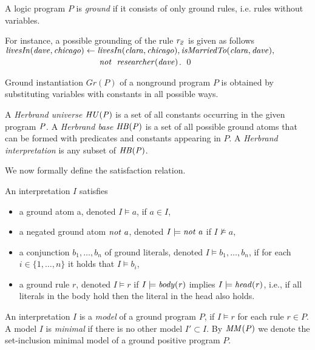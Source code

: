 A logic program $P$ is \emph{ground} if it consists of only ground rules, i.e. rules without
variables. 

\begin{example}
For instance, a possible grounding of the rule $\mathit{r_2}$ is given as follows $\mathit{livesIn(dave,chicago)\leftarrow livesIn(clara,chicago),isMarriedTo(clara,dave),}$\\$
\phantom{livesIn(dave,chicago)\leftarrow}\mathit{not}~ \mathit{\;researcher(dave)}$. \qed
\end{example}

Ground instantiation $Gr(P)$ of a nonground program $P$ is obtained by substituting variables with constants in all possible ways. 


\begin{definition}
A \emph{Herbrand universe}  $\mathit{HU(P)}$ is a set of all constants occurring in the given program $\mathit{P}$. A \emph{Herbrand base}  $\mathit{HB(P)}$ is a set of all possible ground atoms that can be formed with predicates and constants appearing in $P$. A \emph{Herbrand interpretation} is any subset of $\mathit{HB(P)}$.
\end{definition}

We now formally define the satisfaction relation.

\begin{definition} An interpretation $I$ satisfies
\begin{itemize}
\item a ground atom a, denoted $I \models a$, if $a \in I$,
\item a negated ground atom $\mathit{not\; a}$, denoted $I \models \mathit{not\; a}$ if $I \not \models a$,
\item  a conjunction $b_1,\dotsc,b_n$ of ground literals, denoted $I \models b_1,\dotsc,b_n$, if for
each $i\in \{1,\dotsc, n\}$ it holds that $I \models b_i$,
\item a ground rule $r$, denoted $I \models r$ if $I \models \mathit{body(r)}$ implies $I \models \mathit{head(r)}$, i.e., if all literals in the body hold then the literal in the head also holds.
\end{itemize}
\end{definition}

An interpretation $I$ is a \emph{model} of a ground program $P$, if $I \models r$ for each rule
$r \in P$. A model $I$ is \emph{minimal} if there is no other model $I' \subset I$.
By $\mathit{MM(P)}$ we denote the set-inclusion minimal model of a ground positive program $P$.

